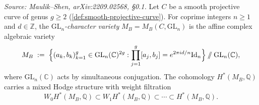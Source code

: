 \begin{definition}[CharacterVariety]
  \label{def:character-variety}
  \textit{Source: Maulik--Shen, arXiv:2209.02568, §0.1.}
  Let $C$ be a smooth projective curve of genus $g \geq 2$ (\cref{def:smooth-projective-curve}).
  For coprime integers $n \geq 1$ and $d \in \mathbb{Z}$, the
  \emph{$\mathrm{GL}_n$-character variety} $M_B = M_B(C, \mathrm{GL}_n)$ is the affine
  complex algebraic variety
  \[
    M_B \;:=\;
    \Bigl\{(a_k, b_k)_{k=1}^g \in \mathrm{GL}_n(\mathbb{C})^{2g} :
      \prod_{j=1}^g [a_j, b_j] = e^{2\pi i d/n} \mathrm{Id}_n
    \Bigr\} \mathbin{/\mkern-6mu/} \mathrm{GL}_n(\mathbb{C}),
  \]
  where $\mathrm{GL}_n(\mathbb{C})$ acts by simultaneous conjugation.  The cohomology
  $H^*(M_B, \mathbb{Q})$ carries a mixed Hodge structure with weight filtration
  \[
    W_0 H^*(M_B, \mathbb{Q}) \subset W_1 H^*(M_B, \mathbb{Q})
    \subset \cdots \subset H^*(M_B, \mathbb{Q}).
  \]
\end{definition}

